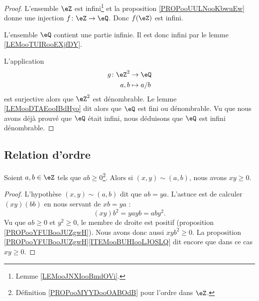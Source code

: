 \begin{proof}
	L'ensemble \( \eZ\) est infini\footnote{Lemme \ref{LEMooJNXIooBmdOVi}.} et la proposition \ref{PROPooUULNooKbwuEw} donne une injection \( f\colon \eZ\to \eQ\). Donc \( f(\eZ)\) est infini.

	L'ensemble \( \eQ\) contient une partie infinie. Il est donc infini par le lemme \ref{LEMooTUIRooEXjfDY}.

	L'application
	\begin{equation}
		\begin{aligned}
			g\colon \eZ^2 & \to \eQ     \\
			a,b           & \mapsto a/b
		\end{aligned}
	\end{equation}
	est surjective alors que \( \eZ^2\) est dénombrable. Le lemme \ref{LEMooDTAEooIBdHyo} dit alors que \( \eQ\) est fini ou dénombrable. Vu que nous avons déjà prouvé que \( \eQ\) était infini, nous déduisons que \( \eQ\) est infini dénombrable.
\end{proof}


\subsection{Relation d'ordre}

\begin{proposition}	\label{PROPooEBCHooYEQkIO}
	Soient \( a,b\in \eZ\) tels que \( ab\geq 0\)\footnote{Définition \ref{PROPooMYYDooOABOdB} pour l'ordre dans \( \eZ\).}. Alors si \( (x,y)\sim(a,b)\), nous avons \( xy\geq 0\).
\end{proposition}

\begin{proof}
	L'hypothèse \( (x,y)\sim (a,b)\) dit que \( ab=ya\). L'astuce est de calculer \( (xy)(bb)\) en nous servant de \( xb=ya\) :
	\begin{equation}
		(xy)b^2=yayb=aby^2.
	\end{equation}
	Vu que \( ab\geq 0\) et \( y^2\geq 0\), le membre de droite est positif (proposition \ref{PROPooYFUBooJUZgwH}). Nous avons donc aussi \( xyb^2\geq 0\). La proposition \ref{PROPooYFUBooJUZgwH}\ref{ITEMooBUHIooLJOSLQ} dit encore que dans ce cas \( xy\geq 0\).
\end{proof}


